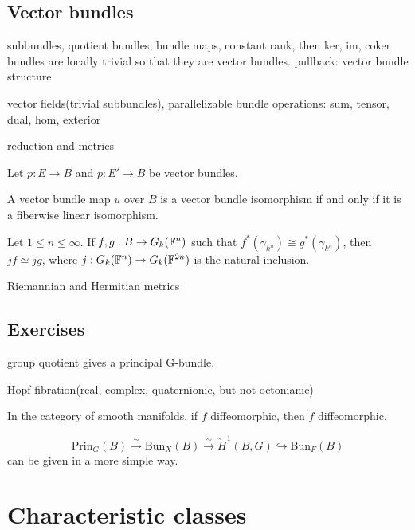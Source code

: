 \documentclass{../../large}
\begin{document}
\section{Vector bundles}
subbundles, quotient bundles, bundle maps,
constant rank, then ker, im, coker bundles are locally trivial so that they are vector bundles.
pullback: vector bundle structure

vector fields(trivial subbundles), parallelizable
bundle operations: sum, tensor, dual, hom, exterior

reduction and metrics

\begin{prb}
Let $p:E\to B$ and $p:E'\to B$ be vector bundles.
\begin{parts}
\item A vector bundle map $u$ over $B$ is a vector bundle isomorphism if and only if it is a fiberwise linear isomorphism.
\end{parts}
\end{prb}



Let $1\le n\le\infty$.
If $f,g:B\to G_k(\mathbb{F}^n)$ such that $f^*(\gamma_{k^n})\cong g^*(\gamma_{k^n})$, then $jf\simeq jg$, where $j:G_k(\mathbb{F}^n)\to G_k(\mathbb{F}^{2n})$ is the natural inclusion.


\begin{prb}
Riemannian and Hermitian metrics
\end{prb}

\section*{Exercises}

group quotient gives a principal G-bundle.

Hopf fibration(real, complex, quaternionic, but not octonianic)

In the category of smooth manifolds, if $f$ diffeomorphic, then $\tilde f$ diffeomorphic.


\begin{prb}

\[\mathrm{Prin}_G(B)\xrightarrow{\sim}\mathrm{Bun}_X(B)\xrightarrow{\sim}\check H^1(B,G)\hookrightarrow\mathrm{Bun}_F(B)\]
can be given in a more simple way.

\end{prb}




\chapter{Characteristic classes}
\end{document}
